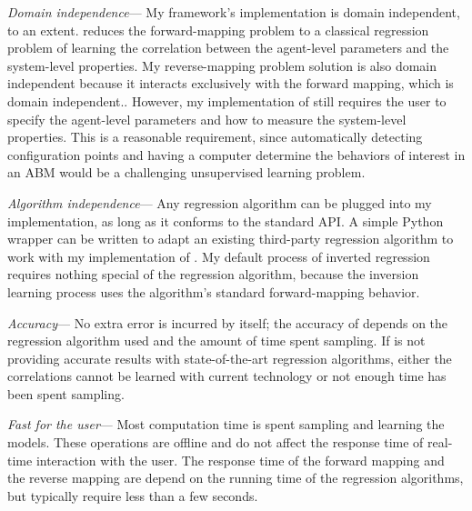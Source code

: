 \textit{Domain independence}---
My framework's implementation is domain independent, to an extent. \fw reduces the forward-mapping problem to a classical regression problem of learning the correlation between the agent-level parameters and the system-level properties.
My reverse-mapping problem solution is also domain independent because it interacts exclusively with the forward mapping, which is domain independent..
However, my implementation of \fw still requires the user to specify the agent-level parameters and how to measure the system-level properties.
This is a reasonable requirement, since automatically detecting configuration points and having a computer determine the behaviors of interest in an ABM would be a challenging unsupervised learning problem.

\textit{Algorithm independence}---
Any regression algorithm can be plugged into my implementation, as long as it conforms to the standard API.
A simple Python wrapper can be written to adapt an existing third-party regression algorithm to work with my implementation of \fw.
My  default process of inverted regression requires nothing special of the regression algorithm, because the inversion learning process uses the algorithm's standard forward-mapping behavior.

\textit{Accuracy}---
No extra error is incurred by \fw itself;
the accuracy of \fw depends on the regression algorithm used and the amount of time spent sampling.
If \fw is not providing accurate results with state-of-the-art regression algorithms, either the correlations cannot be learned with current technology or not enough time has been spent sampling.


\textit{Fast for the user}---
Most computation time is spent sampling and learning the models.
These operations are offline and do not affect the response time of real-time interaction with the user.
The response time of the forward mapping and the reverse mapping are depend on the running time of the regression algorithms, but typically require less than a few seconds.





